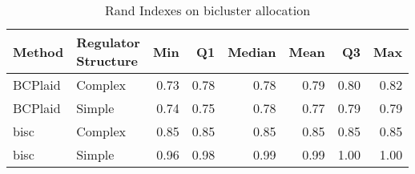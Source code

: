 \begin{table}[ht]
\caption{Rand Indexes on bicluster allocation}
\vspace{1.5cm}
\centering
\begin{tabular}{llrrrrrr}
  \toprule
Method & \makecell{Regulator \\ Structure} & Min & Q1 & Median & Mean & Q3 & Max \\ 
  \midrule
BCPlaid & Complex & 0.73 & 0.78 & 0.78 & 0.79 & 0.80 & 0.82 \\ 
  BCPlaid & Simple & 0.74 & 0.75 & 0.78 & 0.77 & 0.79 & 0.79 \\ 
  bisc & Complex & 0.85 & 0.85 & 0.85 & 0.85 & 0.85 & 0.85 \\ 
  bisc & Simple & 0.96 & 0.98 & 0.99 & 0.99 & 1.00 & 1.00 \\ 
   \bottomrule
\end{tabular}
\end{table}
